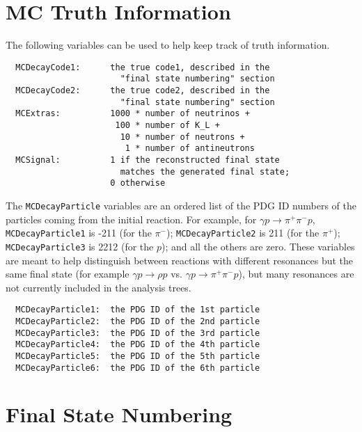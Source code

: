 \documentclass[11pt]{article}
\begin{document}
\section{MC Truth Information}
\label{sec:nt:truth}

The following variables can be used to help keep track of truth information.

\begin{verbatim}
  MCDecayCode1:      the true code1, described in the
                       "final state numbering" section
  MCDecayCode2:      the true code2, described in the
                       "final state numbering" section
  MCExtras:          1000 * number of neutrinos +
                      100 * number of K_L +
                       10 * number of neutrons +
                        1 * number of antineutrons
  MCSignal:          1 if the reconstructed final state
                       matches the generated final state;
                     0 otherwise
\end{verbatim}

The {\tt MCDecayParticle} variables are an ordered list of the PDG ID numbers of the particles coming from the initial reaction.  
For example, for $\gamma p \to \pi^+ \pi^- p$, 
{\tt MCDecayParticle1} is -211 (for the $\pi^-$); 
{\tt MCDecayParticle2} is 211 (for the $\pi^+$); 
{\tt MCDecayParticle3} is 2212 (for the $p$);
and all the others are zero.  
These variables are meant to help distinguish between reactions with different resonances but the same final state (for example $\gamma p \to \rho p$ vs. $\gamma p \to \pi^+ \pi^- p$), but many resonances are not currently included in the analysis trees.

\begin{verbatim}
  MCDecayParticle1:  the PDG ID of the 1st particle
  MCDecayParticle2:  the PDG ID of the 2nd particle
  MCDecayParticle3:  the PDG ID of the 3rd particle
  MCDecayParticle4:  the PDG ID of the 4th particle
  MCDecayParticle5:  the PDG ID of the 5th particle
  MCDecayParticle6:  the PDG ID of the 6th particle
\end{verbatim}

\section{Final State Numbering}
\label{sec:numbering}
\end{document}
